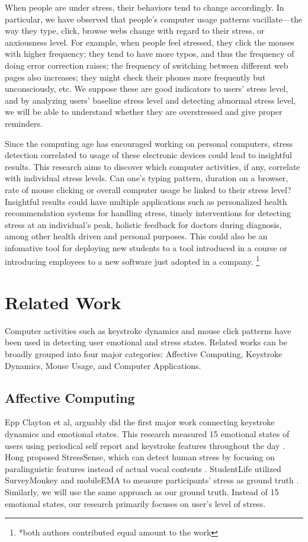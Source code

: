 \documentclass{article}
\begin{document}
When people are under stress, their behaviors tend to change accordingly. In particular, we have observed that people's computer usage patterns vacillate---the way they type, click, browse webs change with regard to their stress, or anxiousness level. For example, when people feel stressed, they click the mouses with higher frequency; they tend to have more typos, and thus the frequency of doing error correction raises; the frequency of switching between different web pages also increases; they might check their phones more frequently but unconsciously, etc. We suppose these are good indicators to users’ stress level, and by analyzing users’ baseline stress level and detecting abnormal stress level, we will be able to understand whether they are overstressed and give proper reminders.

Since the computing age has encouraged working on personal computers, stress detection correlated to usage of these electronic devices could lead to insightful results. This research aims to discover which computer activities, if any, correlate with individual stress levels. Can one's typing pattern, duration on a browser, rate of mouse clicking or overall computer usage be linked to their stress level?  Insightful results could have multiple applications such as personalized health recommendation systems for handling stress, timely interventions for detecting stress at an individual’s peak, holistic feedback for doctors during diagnosis, among other health driven and personal purposes. This could also be an infomative tool for deploying new students to a tool introduced in a course or introducing employees to a new software just adopted in a company. 
\footnote{*both authors contributed equal amount to the work}
\section{Related Work}
Computer activities such as keystroke dynamics and mouse click patterns have been used in detecting user emotional and stress states. Related works can be broadly grouped into four major categories: Affective Computing, Keystroke Dynamics, Mouse Usage, and Computer Applications. 

\subsection{Affective Computing}
Epp Clayton et al, arguably did the first major work connecting keystroke dynamics and emotional states. This research measured 15 emotional states of users using periodical self report and keystroke features throughout the day \cite{epp2011identifying}. Hong proposed StressSense, which can detect human stress by focusing on  paralinguistic features instead of actual vocal contents \cite{lu2012stresssense}. StudentLife utilized SurveyMonkey and mobileEMA to measure participants’ stress as ground truth \cite{wang2014studentlife}. Similarly, we will use the same approach as our ground truth. Instead of 15 emotional states, our research primarily focuses on user's level of stress.
\end{document}
